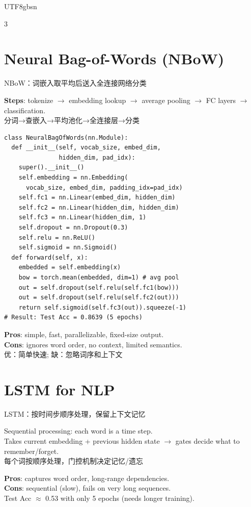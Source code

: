 \documentclass[9pt,landscape,a4paper]{article}
\newcommand{\zhint}[1]{{\scriptsize\color{gray!70!black}#1}}
\begin{document}
\begin{CJK}{UTF8}{gbsn}
\begin{multicols}{3}
\section{Neural Bag-of-Words (NBoW)}
\zhint{NBoW：词嵌入取平均后送入全连接网络分类}

\textbf{Steps}: tokenize $\to$ embedding lookup $\to$ average pooling $\to$ FC layers $\to$ classification.\\
\zhint{分词→查嵌入→平均池化→全连接层→分类}

\begin{lstlisting}
class NeuralBagOfWords(nn.Module):
  def __init__(self, vocab_size, embed_dim,
               hidden_dim, pad_idx):
    super().__init__()
    self.embedding = nn.Embedding(
      vocab_size, embed_dim, padding_idx=pad_idx)
    self.fc1 = nn.Linear(embed_dim, hidden_dim)
    self.fc2 = nn.Linear(hidden_dim, hidden_dim)
    self.fc3 = nn.Linear(hidden_dim, 1)
    self.dropout = nn.Dropout(0.3)
    self.relu = nn.ReLU()
    self.sigmoid = nn.Sigmoid()
  def forward(self, x):
    embedded = self.embedding(x)
    bow = torch.mean(embedded, dim=1) # avg pool
    out = self.dropout(self.relu(self.fc1(bow)))
    out = self.dropout(self.relu(self.fc2(out)))
    return self.sigmoid(self.fc3(out)).squeeze(-1)
# Result: Test Acc = 0.8639 (5 epochs)
\end{lstlisting}

\textbf{Pros}: simple, fast, parallelizable, fixed-size output.\\
\textbf{Cons}: ignores word order, no context, limited semantics.\\
\zhint{优：简单快速; 缺：忽略词序和上下文}

\section{LSTM for NLP}
\zhint{LSTM：按时间步顺序处理，保留上下文记忆}

Sequential processing: each word is a time step.\\
Takes current embedding + previous hidden state $\to$ gates decide what to remember/forget.\\
\zhint{每个词按顺序处理，门控机制决定记忆/遗忘}

\textbf{Pros}: captures word order, long-range dependencies.\\
\textbf{Cons}: sequential (slow), fails on very long sequences.\\
Test Acc $\approx$ 0.53 with only 5 epochs (needs longer training).


\end{multicols}
\end{CJK}
\end{document}
